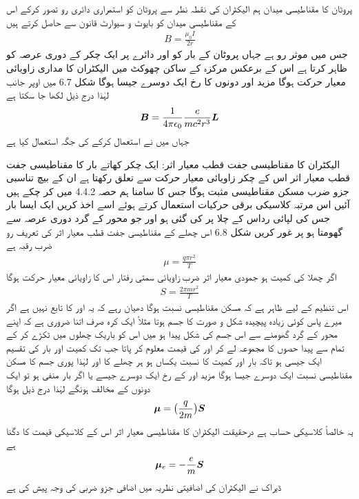 پروٹان کا مقناطیسی میدان ہم الیکٹران کی نقطہ نظر سے پروٹان کو استمراری دائری  رو تصور کرکے اس کے مقناطیسی میدان کو بایوٹ و سيوارٹ قانون سے حاصل کرتے ہیں 
\begin{align*} 
B = \frac{\mu_0 I}{2r}
\end{align*}
جس میں موثر رو  ہے جہاں  پروٹان کے بار کو اور  دائرے پر ایک چکر کے دوری عرصہ کو ظاہر کرتا ہے اس کے برعکس مرکزہ کے ساکن  چھوکٹ میں الیکٹران کا مداری زاویائی معیار حرکت  ہوگا مزید  اور  دونوں کا رخ ایک دوسرے جیسا ہوگا شکل 6.7 میں اوپر جانب لہٰذا   درج ذیل لکھا جا سکتا ہے 
\begin{align}
{\ensuremath{{\boldsymbol{B}}}} = \frac{1}{4 \pi \epsilon_0} \frac{e}{mc^2 r^3} {{\boldsymbol{L}}}
\end{align}
جہاں میں نے  استعمال کرکے  کی جگہ  استعمال کیا ہے 

الیکٹران کا مقناطیسی جفت قطب معیار اثر: ایک چکر کھاتے بار کا مقناطیسی جفت قطب معیار اثر اس کے چکر زاویائی معیار حرکت سے تعلق رکھتا ہے ان کے بیچ تناسبی جزو ضرب مسکن مقناطیسی مثبت ہوگا جس کا سامنا ہم حصہ 4.4.2 میں کر چکے ہیں آئیں اس مرتبہ  کلاسیکی برقی حرکیات استعمال کرتے ہوئے اسے اخذ کریں ایک ایسا بار  جس کی لپائی  رداس  کے چلا پر  کی گئی ہو اور جو محور کے گرد دوری عرصہ  سے گھومتا ہو پر غور کریں شکل 6.8 اس چھلے کے مقناطیسی جفت قطب معیار اثر کی تعریف رو  ضرب رقبہ  ہے 
\begin{align*}
\mu = \frac{q \pi r^2}{T}
\end{align*}
اگر چھلا کی کمیت  ہو جمودی معیار اثر  ضرب زاویائی سمتی رفتار  اس کا زاویائی معیار حرکت ہوگا 
\begin{align*} 
S = \frac{2 \pi mr^2}{T}
\end{align*}
اس  تنظیم  کے لیے ظاہر ہے کہ مسکن مقناطیسی نسبت  ہوگا دھیان رہے کہ یہ  اور  کا  تابع نہیں  ہے اگر میرے پاس کوئی زیادہ پیچیدہ شکل و صورت کا جسم ہوتا مثلاً  ایک  کرہ  صرف اتنا ضروری ہے کہ اپنے محور کے گرد گھومنے سے اس جسم کی شکل پیدا ہو میں اس کو باریک چھلوں میں ٹکڑے کر کے تمام  سے پیدا حصوں کا مجموعہ لے کر  اور  کی قیمت معلوم کر پاتا جب تک کمیت اور بار کی تقسیم ایک جیسی ہو تاکہ بار اور کمیت کا نسبت یکساں ہو ہر  چھلے  کا اور لہٰذا   پوری جسم کا مسکن مقناطیسی نسبت ایک دوسرے جیسا ہوگا مزید  اور  کے رخ ایک دوسرے جیسے یا اگر بار منفی ہو تو ایک دونوں کے مخالف ہونگے لہٰذا   درج ذیل ہوگا 
\begin{align*}
{\ensuremath{{\boldsymbol{\mu}}}} = \big ( \frac{q}{2m} \big ) {{\boldsymbol{S}}}
\end{align*}
یہ خالصاً  کلاسیکی حساب ہے درحقیقت الیکٹران کا مقناطیسی معیار اثر اس کے کلاسیکی قیمت کا دگنا ہے 
\begin{align}
{\ensuremath{{\boldsymbol{\mu}}}}_e = - \frac{e}{m} {{\boldsymbol{S}}}
\end{align}
ڈیراک   نے الیکٹران کی اضافیتی نظریہ میں اضافی جزو ضربی  کی وجہ پیش کی ہے

